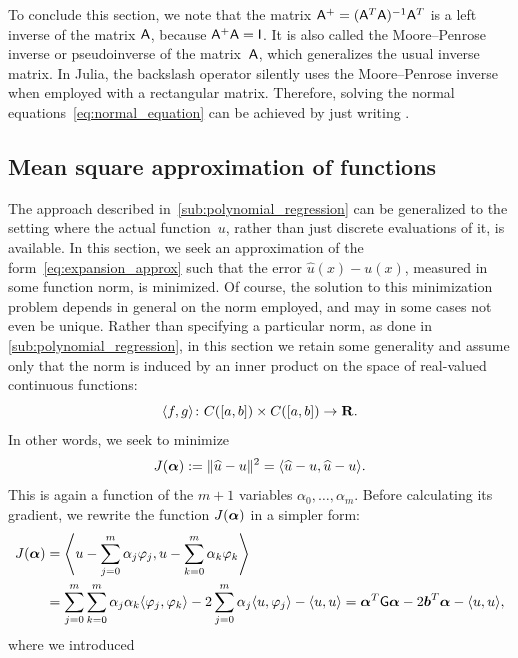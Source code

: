 To conclude this section,
we note that the matrix $\mat A^{+} = (\mat A^\t \mat A)^{-1} \mat A^\t$ is a left inverse of the matrix $\mat A$,
because $\mat A^+ \mat A = \mat I$.
It is also called the Moore--Penrose inverse or pseudoinverse of the matrix~$\mat A$,
which generalizes the usual inverse matrix.
In Julia, the backslash operator silently uses the Moore--Penrose inverse when employed with a rectangular matrix.
Therefore, solving the normal equations~\eqref{eq:normal_equation} can be achieved by just writing .

\subsection{Mean square approximation of functions}
\label{sub:mean_square_approximation}
The approach described in~\cref{sub:polynomial_regression} can be generalized to the setting where the actual function~$u$,
rather than just discrete evaluations of it, is available.
In this section, we seek an approximation of the form~\eqref{eq:expansion_approx}
such that the error $\widehat u(x) - u(x)$, measured in some function norm,
is minimized.
Of course, the solution to this minimization problem depends in general on the norm employed,
and may in some cases not even be unique.
Rather than specifying a particular norm,
as done in \cref{sub:polynomial_regression},
in this section we retain some generality and assume only that the norm is induced by an inner product on the space of real-valued continuous functions:
\begin{equation}
    \label{eq:inner_product_approx}
    \ip{f,g} \colon C([a,b]) \times C([a, b]) \to \real.
\end{equation}
In other words,
we seek to minimize
\[
    J(\vect \alpha) := \norm{\widehat u - u}^2 = \ip{\widehat u - u, \widehat u - u}.
\]
This is again a function of the $m+1$ variables $\alpha_0, \dotsc, \alpha_m$.
Before calculating its gradient,
we rewrite the function $J(\vect \alpha)$ in a simpler form:
\begin{align*}
    J(\vect \alpha)
    &= \ip*{u - \sum_{j=0}^{m} \alpha_j \varphi_j,u - \sum_{k=0}^{m} \alpha_k \varphi_k} \\
    &= \sum_{j=0}^{m} \sum_{k=0}^{m} \alpha_j \alpha_k \ip{\varphi_j,\varphi_k}- 2 \sum_{j=0}^{m} \alpha_j \ip{u,\varphi_j} - \ip{u,u}
    = \vect \alpha^\t \mat G \vect \alpha - 2 \vect b^\t \vect \alpha - \ip{u,u},
\end{align*}
where we introduced
